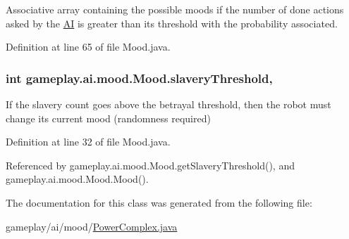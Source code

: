 Associative array containing the possible moods if the number of done actions asked by the \hyperlink{classgameplay_1_1ai_1_1_a_i}{A\-I} is greater than its threshold with the probability associated. 



Definition at line 65 of file Mood.\-java.

\hypertarget{classgameplay_1_1ai_1_1mood_1_1_mood_a12c9abed7c077f9013956cda08e41619}{
\subsubsection[{slavery\-Threshold}]{\setlength{\rightskip}{0pt plus 5cm}int gameplay.\-ai.\-mood.\-Mood.\-slavery\-Threshold\hspace{0.3cm}{\ttfamily [protected]}, {\ttfamily [inherited]}}}\label{classgameplay_1_1ai_1_1mood_1_1_mood_a12c9abed7c077f9013956cda08e41619}


If the slavery count goes above the betrayal threshold, then the robot must change its current mood (randomness required) 



Definition at line 32 of file Mood.\-java.



Referenced by gameplay.\-ai.\-mood.\-Mood.\-get\-Slavery\-Threshold(), and gameplay.\-ai.\-mood.\-Mood.\-Mood().



The documentation for this class was generated from the following file\-:\begin{DoxyCompactItemize}
\item 
gameplay/ai/mood/\hyperlink{_power_complex_8java}{Power\-Complex.\-java}\end{DoxyCompactItemize}
